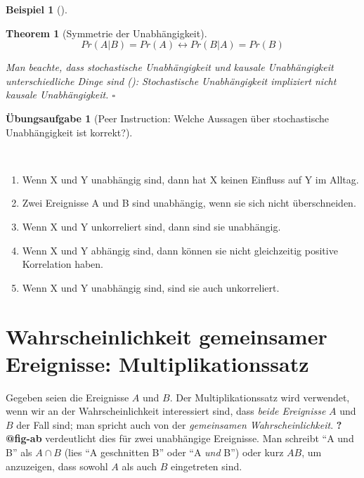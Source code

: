 \documentclass[
  ngerman,
  letterpaper,
  twoside,
  open=any]{scrbook}
\providecommand{\tightlist}{%
  \setlength{\itemsep}{0pt}\setlength{\parskip}{0pt}}\usepackage{longtable,booktabs,array}
\theoremstyle{definition}
\newtheorem{example}{Beispiel}[chapter]
\theoremstyle{plain}
\newtheorem{theorem}{Theorem}[chapter]
\theoremstyle{definition}
\newtheorem{exercise}{Übungsaufgabe}[chapter]
\theoremstyle{definition}
\theoremstyle{remark}
\begin{document}
\begin{example}[]
\begin{theorem}[Symmetrie der
Unabhängigkeit]
\[Pr(A|B) = Pr(A) \leftrightarrow Pr(B|A) = Pr(B)\]

Man beachte, dass stochastische Unabhängigkeit und kausale
Unabhängigkeit unterschiedliche Dinge sind
(): Stochastische Unabhängigkeit
impliziert nicht kausale Unabhängigkeit. \(\square\)

\end{theorem}

\begin{exercise}[Peer Instruction: Welche Aussagen über stochastische
Unabhängigkeit ist
korrekt?]\protect\hypertarget{exr-indep}{}\label{exr-indep}

~

\begin{enumerate}
\def\labelenumi{\arabic{enumi}.}
\tightlist
\item
  Wenn X und Y unabhängig sind, dann hat X keinen Einfluss auf Y im
  Alltag.\\
\item
  Zwei Ereignisse A und B sind unabhängig, wenn sie sich nicht
  überschneiden.\\
\item
  Wenn X und Y unkorreliert sind, dann sind sie unabhängig.
\item
  Wenn X und Y abhängig sind, dann können sie nicht gleichzeitig
  positive Korrelation haben.
\item
  Wenn X und Y unabhängig sind, sind sie auch unkorreliert.
\end{enumerate}

\end{exercise}

\section{Wahrscheinlichkeit gemeinsamer Ereignisse:
Multiplikationssatz}\label{wahrscheinlichkeit-gemeinsamer-ereignisse-multiplikationssatz}

Gegeben seien die Ereignisse \(A\) und \(B\). Der Multiplikationssatz
wird verwendet, wenn wir an der Wahrscheinlichkeit interessiert sind,
dass \emph{beide Ereignisse} \(A\) und \(B\) der Fall sind; man spricht
auch von der \emph{gemeinsamen Wahrscheinlichkeit}. \textbf{?@fig-ab}
verdeutlicht dies für zwei unabhängige Ereignisse. Man schreibt
\enquote{A und B} als \(A \cap B\) (lies \enquote{A geschnitten B} oder
\enquote{A \emph{und} B}) oder kurz \(AB\), um anzuzeigen, dass sowohl
\(A\) als auch \(B\) eingetreten sind.


\end{example}
\end{document}
